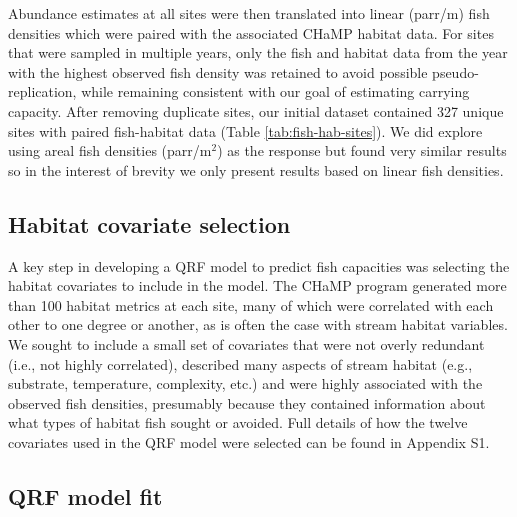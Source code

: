 \documentclass[
  12pt,
]{article}
\begin{document}
Abundance estimates at all sites were then translated into linear (parr/m) fish densities which were paired with the associated CHaMP habitat data. For sites that were sampled in multiple years, only the fish and habitat data from the year with the highest observed fish density was retained to avoid possible pseudo-replication, while remaining consistent with our goal of estimating carrying capacity. After removing duplicate sites, our initial dataset contained 327 unique sites with paired fish-habitat data (Table \ref{tab:fish-hab-sites}). We did explore using areal fish densities (parr/m\(^2\)) as the response but found very similar results so in the interest of brevity we only present results based on linear fish densities.

\hypertarget{habitat-covariate-selection}{%
\subsection{Habitat covariate selection}\label{habitat-covariate-selection}}

A key step in developing a QRF model to predict fish capacities was selecting the habitat covariates to include in the model. The CHaMP program generated more than 100 habitat metrics at each site, many of which were correlated with each other to one degree or another, as is often the case with stream habitat variables. We sought to include a small set of covariates that were not overly redundant (i.e., not highly correlated), described many aspects of stream habitat (e.g., substrate, temperature, complexity, etc.) and were highly associated with the observed fish densities, presumably because they contained information about what types of habitat fish sought or avoided. Full details of how the twelve covariates used in the QRF model were selected can be found in Appendix S1.

\hypertarget{qrf-model-fit}{%
\subsection{QRF model fit}\label{qrf-model-fit}}
\end{document}
